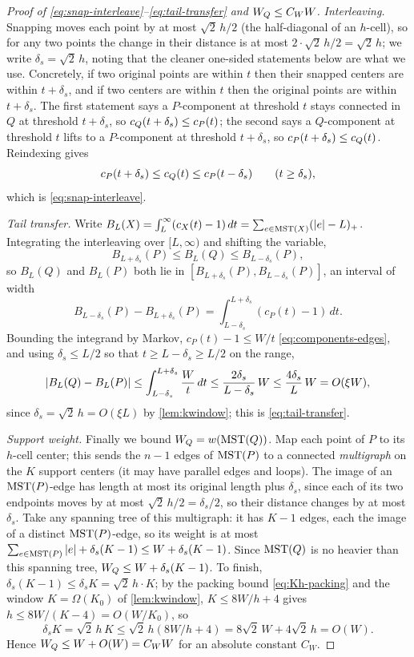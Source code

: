 \begin{proof}[Proof of \eqref{eq:snap-interleave}--\eqref{eq:tail-transfer} and $W_Q\le C_W W$]
\emph{Interleaving.} Snapping moves each point by at most $\sqrt2\,h/2$ (the half-diagonal of an
$h$-cell), so for any two points the change in their distance is at most $2\cdot\sqrt2\,h/2=\sqrt2\,h$; we
write $\delta_s=\sqrt2\,h$, noting that the cleaner one-sided statements below are what we use. Concretely, if two original points are within
$t$ then their snapped centers are within $t+\delta_s$, and if two centers are within $t$ then the
original points are within $t+\delta_s$. The first statement says a $P$-component at threshold $t$ stays
connected in $Q$ at threshold $t+\delta_s$, so $c_Q(t+\delta_s)\le c_P(t)$; the second says a
$Q$-component at threshold $t$ lifts to a $P$-component at threshold $t+\delta_s$, so $c_P(t+\delta_s)\le
c_Q(t)$. Reindexing gives
\[
  c_P(t+\delta_s)\le c_Q(t)\le c_P(t-\delta_s)\qquad(t\ge\delta_s),
\]
which is \eqref{eq:snap-interleave}.

\emph{Tail transfer.} Write $B_L(X)=\int_L^\infty(c_X(t)-1)\,dt=\sum_{e\in\mathrm{MST}(X)}(\left|e\right|-L)_+$. Integrating
the interleaving over $[L,\infty)$ and shifting the variable,
\[
  B_{L+\delta_s}(P)\le B_L(Q)\le B_{L-\delta_s}(P),
\]
so $B_L(Q)$ and $B_L(P)$ both lie in $[B_{L+\delta_s}(P),B_{L-\delta_s}(P)]$, an interval of width
\[
  B_{L-\delta_s}(P)-B_{L+\delta_s}(P)=\int_{L-\delta_s}^{L+\delta_s}(c_P(t)-1)\,dt .
\]
Bounding the integrand by Markov, $c_P(t)-1\le W/t$ \eqref{eq:components-edges}, and using $\delta_s\le
L/2$ so that $t\ge L-\delta_s\ge L/2$ on the range,
\[
  \left|B_L(Q)-B_L(P)\right|\le\int_{L-\delta_s}^{L+\delta_s}\frac Wt\,dt\le\frac{2\delta_s}{L-\delta_s}\,W
   \le\frac{4\delta_s}{L}\,W=O(\xi W),
\]
since $\delta_s=\sqrt2\,h=O(\xi L)$ by \cref{lem:kwindow}; this is \eqref{eq:tail-transfer}.

\emph{Support weight.} Finally we bound $W_Q=w(\mathrm{MST}(Q))$. Map each point of $P$ to its $h$-cell center;
this sends the $n-1$ edges of $\mathrm{MST}(P)$ to a connected \emph{multigraph} on the $K$ support centers (it may
have parallel edges and loops). The image of an $\mathrm{MST}(P)$-edge has length at most its original length plus
$\delta_s$, since each of its two endpoints moves by at most $\sqrt2\,h/2=\delta_s/2$, so their distance
changes by at most $\delta_s$. Take any spanning tree of this multigraph: it has $K-1$ edges, each the
image of a distinct $\mathrm{MST}(P)$-edge, so its weight is at most $\sum_{e\in\mathrm{MST}(P)}\left|e\right|+\delta_s(K-1)\le
W+\delta_s(K-1)$. Since $\mathrm{MST}(Q)$ is no heavier than this spanning tree, $W_Q\le W+\delta_s(K-1)$.
To finish, $\delta_s(K-1)\le\delta_s K=\sqrt2\,h\cdot K$; by the packing bound \eqref{eq:Kh-packing} and
the window $K=\Omega(K_0)$ of \cref{lem:kwindow}, $K\le 8W/h+4$ gives $h\le 8W/(K-4)=O(W/K_0)$, so
\[
  \delta_s K=\sqrt2\,h\,K\le\sqrt2\,h(8W/h+4)=8\sqrt2\,W+4\sqrt2\,h=O(W) .
\]
Hence $W_Q\le W+O(W)=C_W W$ for an absolute constant $C_W$.
\end{proof}

